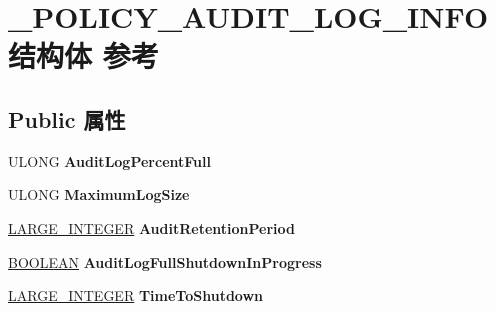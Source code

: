 \hypertarget{struct___p_o_l_i_c_y___a_u_d_i_t___l_o_g___i_n_f_o}{}\section{\+\_\+\+P\+O\+L\+I\+C\+Y\+\_\+\+A\+U\+D\+I\+T\+\_\+\+L\+O\+G\+\_\+\+I\+N\+F\+O结构体 参考}
\label{struct___p_o_l_i_c_y___a_u_d_i_t___l_o_g___i_n_f_o}
\subsection*{Public 属性}
\begin{DoxyCompactItemize}
\item 
\mbox{\label{struct___p_o_l_i_c_y___a_u_d_i_t___l_o_g___i_n_f_o_af37e35d0d25d4539a1dc3001e7f95e15}} 
U\+L\+O\+NG {\bfseries Audit\+Log\+Percent\+Full}
\item 
\mbox{\label{struct___p_o_l_i_c_y___a_u_d_i_t___l_o_g___i_n_f_o_a336f0000f8235426fa7d73cab1442d15}} 
U\+L\+O\+NG {\bfseries Maximum\+Log\+Size}
\item 
\mbox{\label{struct___p_o_l_i_c_y___a_u_d_i_t___l_o_g___i_n_f_o_a60d247411a8c3f141a4093d7cac5236f}} 
\hyperlink{union___l_a_r_g_e___i_n_t_e_g_e_r}{L\+A\+R\+G\+E\+\_\+\+I\+N\+T\+E\+G\+ER} {\bfseries Audit\+Retention\+Period}
\item 
\mbox{\label{struct___p_o_l_i_c_y___a_u_d_i_t___l_o_g___i_n_f_o_a682cd309e0ecc049cfee670503da26c0}} 
\hyperlink{_processor_bind_8h_a112e3146cb38b6ee95e64d85842e380a}{B\+O\+O\+L\+E\+AN} {\bfseries Audit\+Log\+Full\+Shutdown\+In\+Progress}
\item 
\mbox{\label{struct___p_o_l_i_c_y___a_u_d_i_t___l_o_g___i_n_f_o_ae5f410f96f61bc6bc65e99f9e6be58f5}} 
\hyperlink{union___l_a_r_g_e___i_n_t_e_g_e_r}{L\+A\+R\+G\+E\+\_\+\+I\+N\+T\+E\+G\+ER} {\bfseries Time\+To\+Shutdown}
\item 
\mbox{\label{struct___p_o_l_i_c_y___a_u_d_i_t___l_o_g___i_n_f_o_a7b159bf90e17a2c1d205ccb59684befb}} 

\end{DoxyCompactItemize}
